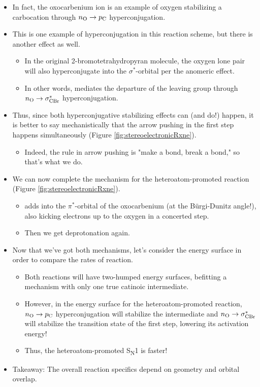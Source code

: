 \documentclass[../notes.tex]{subfiles}
\begin{document}
\begin{itemize}
\begin{itemize}
\begin{itemize}
        \end{itemize}
        \item In fact, the oxocarbenium ion is an example of oxygen stabilizing a carbocation through $n_{\ce{O}}\to p_{\ce{C}}$ hyperconjugation.
        \item This is one example of hyperconjugation in this reaction scheme, but there is another effect as well.
        \begin{itemize}
            \item In the original 2-bromotetrahydropyran molecule, the oxygen lone pair will also hyperconjugate into the  $\sigma^*$-orbital per the anomeric effect.
            \item In other words,  mediates the departure of the leaving group through $n_{\ce{O}}\to\sigma_{\ce{CBr}}^*$ hyperconjugation.
        \end{itemize}
        \item Thus, since both hyperconjugative stabilizing effects can (and do!) happen, it is better to say mechanistically that the arrow pushing in the first step happens simultaneously (Figure \ref{fig:stereoelectronicRxne}).
        \begin{itemize}
            \item Indeed, the rule in arrow pushing is "make a bond, break a bond," so that's what we do.
        \end{itemize}
        \item We can now complete the mechanism for the heteroatom-promoted reaction (Figure \ref{fig:stereoelectronicRxne}).
        \begin{itemize}
            \item {} adds into the $\pi^*$-orbital of the oxocarbenium (at the B\"{u}rgi-Dunitz angle!), also kicking electrons up to the oxygen in a concerted step.
            \item Then we get deprotonation again.
        \end{itemize}
        \item Now that we've got both mechanisms, let's consider the energy surface in order to compare the rates of reaction.
        \begin{itemize}
            \item Both reactions will have two-humped energy surfaces, befitting a mechanism with only one true catinoic intermediate.
            \item However, in the energy surface for the heteroatom-promoted reaction, $n_{\ce{O}}\to p_{\ce{C}}$ hyperconjugation will stabilize the intermediate and $n_{\ce{O}}\to\sigma_{\ce{CBr}}^*$ will stabilize the transition state of the first step, lowering its activation energy!
            \item Thus, the heteroatom-promoted S\textsubscript{N}1 is faster!
        \end{itemize}
        \item Takeaway: The overall reaction specifics depend on geometry and orbital overlap.
    \end{itemize}
\end{itemize}
\end{document}
